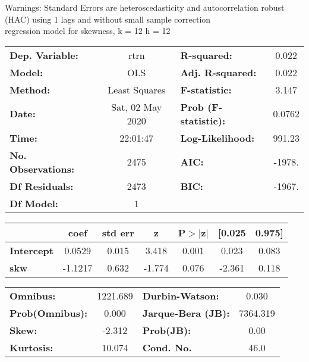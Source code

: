 Warnings: \newline
 [1] Standard Errors are heteroscedasticity and autocorrelation robust (HAC) using 1 lags and without small sample correction\\ 

regression model for skewness, k = 12 h = 12\begin{center}
\begin{tabular}{lclc}
\toprule
\textbf{Dep. Variable:}    &       rtrn       & \textbf{  R-squared:         } &     0.022   \\
\textbf{Model:}            &       OLS        & \textbf{  Adj. R-squared:    } &     0.022   \\
\textbf{Method:}           &  Least Squares   & \textbf{  F-statistic:       } &     3.147   \\
\textbf{Date:}             & Sat, 02 May 2020 & \textbf{  Prob (F-statistic):} &   0.0762    \\
\textbf{Time:}             &     22:01:47     & \textbf{  Log-Likelihood:    } &    991.23   \\
\textbf{No. Observations:} &        2475      & \textbf{  AIC:               } &    -1978.   \\
\textbf{Df Residuals:}     &        2473      & \textbf{  BIC:               } &    -1967.   \\
\textbf{Df Model:}         &           1      & \textbf{                     } &             \\
\bottomrule
\end{tabular}
\begin{tabular}{lcccccc}
                   & \textbf{coef} & \textbf{std err} & \textbf{z} & \textbf{P$> |$z$|$} & \textbf{[0.025} & \textbf{0.975]}  \\
\midrule
\textbf{Intercept} &       0.0529  &        0.015     &     3.418  &         0.001        &        0.023    &        0.083     \\
\textbf{skw}       &      -1.1217  &        0.632     &    -1.774  &         0.076        &       -2.361    &        0.118     \\
\bottomrule
\end{tabular}
\begin{tabular}{lclc}
\textbf{Omnibus:}       & 1221.689 & \textbf{  Durbin-Watson:     } &    0.030  \\
\textbf{Prob(Omnibus):} &   0.000  & \textbf{  Jarque-Bera (JB):  } & 7364.319  \\
\textbf{Skew:}          &  -2.312  & \textbf{  Prob(JB):          } &     0.00  \\
\textbf{Kurtosis:}      &  10.074  & \textbf{  Cond. No.          } &     46.0  \\
\bottomrule
\end{tabular}
\end{center}

